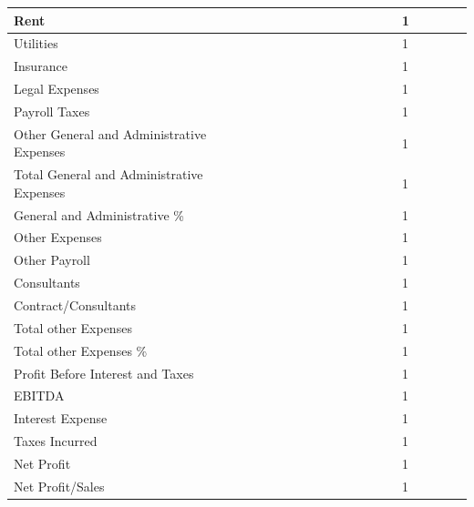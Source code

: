 \documentclass[11pt]{article}
\begin{document}
\begin{landscape}
\begin{scriptsize}
\begin{tabular}{ | l | l | l | l | l | l | l | l | l | l | l | l | l | l | l | l | l | l |}
  Rent & & & & & & & & & & & & & 1 \\ \hline
  Utilities & & & & & & & & & & & & & 1 \\ \hline
  Insurance & & & & & & & & & & & & & 1 \\ \hline
  Legal Expenses & & & & & & & & & & & & & 1 \\ \hline
  Payroll Taxes & & & & & & & & & & & & & 1 \\ \hline
  Other General and Administrative Expenses & & & & & & & & & & & & & 1 \\ \hline
  Total General and Administrative Expenses & & & & & & & & & & & & & 1 \\ \hline
  General and Administrative \% & & & & & & & & & & & & & 1 \\ \hline
  Other Expenses & & & & & & & & & & & & & 1 \\ \hline
  Other Payroll & & & & & & & & & & & & & 1 \\ \hline
  Consultants & & & & & & & & & & & & & 1 \\ \hline
  Contract/Consultants & & & & & & & & & & & & & 1 \\ \hline
  Total other Expenses & & & & & & & & & & & & & 1 \\ \hline
  Total other Expenses \% & & & & & & & & & & & & & 1 \\ \hline
  Profit Before Interest and Taxes & & & & & & & & & & & & & 1 \\ \hline
  EBITDA & & & & & & & & & & & & & 1 \\ \hline
  Interest Expense & & & & & & & & & & & & & 1 \\ \hline
  Taxes Incurred & & & & & & & & & & & & & 1 \\ \hline
  Net Profit & & & & & & & & & & & & & 1 \\ \hline
  Net Profit/Sales & & & & & & & & & & & & & 1 \\ \hline
\end{tabular}
\end{scriptsize}
\end{landscape}
\newpage
\thispagestyle{empty}
\end{document}
